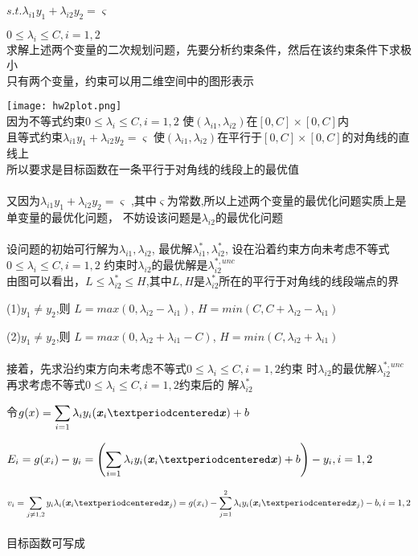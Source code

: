 \documentclass[UTF8]{ctexart}
\begin{document}
$s.t. $\quad $\lambda_{i1} y_1+\lambda_{i2} y_2=\varsigma $

$0 \leq \lambda_i \leq C,i=1,2$
\\
求解上述两个变量的二次规划问题，先要分析约束条件，然后在该约束条件下求极小
\\
只有两个变量，约束可以用二维空间中的图形表示

\texttt{[image: hw2plot.png]}
\\
因为不等式约束$0 \leq \lambda_i \leq C,i=1,2$
使$(\lambda_{i1},\lambda_{i2})$在$[0,C]×[0,C]$内
\\
且等式约束$\lambda_{i1} y_1+\lambda_{i2} y_2=\varsigma $
使$(\lambda_{i1},\lambda_{i2})$在平行于$[0,C]×[0,C]$的对角线的直线上
\\
所以要求是目标函数在一条平行于对角线的线段上的最优值
\\
\\
又因为$\lambda_{i1} y_1+\lambda_{i2} y_2=\varsigma $
,其中$\varsigma$为常数,所以上述两个变量的最优化问题实质上是单变量的最优化问题，
不妨设该问题是$\lambda_{i2}$的最优化问题
\\
\\
设问题的初始可行解为$\lambda_{i1},\lambda_{i2}$,
最优解$\lambda_{i1}^*,\lambda_{i2}^*$,
设在沿着约束方向未考虑不等式$0 \leq \lambda_i \leq C,i=1,2$
约束时$\lambda_{i2}$的最优解是$\lambda_{i2}^{*,unc}$
\\
由图可以看出，$L \leq \lambda_{i2}^* \leq H$,其中$L,H$是$\lambda_{i2}^*$所在的平行于对角线的线段端点的界

(1)$y_1 \neq y_2$,则
$L=max(0,\lambda_{i2}-\lambda_{i1})$,
$H=min(C,C+\lambda_{i2}-\lambda_{i1})$

(2)$y_1 \neq y_2$,则
$L=max(0,\lambda_{i2}+\lambda_{i1}-C)$,
$H=min(C,\lambda_{i2}+\lambda_{i1})$
\\
\\
接着，先求沿约束方向未考虑不等式$0 \leq \lambda_i \leq C,i=1,2$约束
时$\lambda_{i2}$的最优解$\lambda_{i2}^{*,unc}$
\\
再求考虑不等式$0 \leq \lambda_i \leq C,i=1,2$约束后的
解$\lambda_{i2}^*$

令$\displaystyle{g(x)=\sum_{i= 1}\lambda_iy_i(\textbf{\emph{x}}_i·\textbf{\emph{x}})+b}$

$\displaystyle{E_i=g(x_i)-y_i=\left(
        \sum_{i= 1}\lambda_iy_i(\textbf{\emph{x}}_i·\textbf{\emph{x}})+b
        \right)-y_i,i=1,2}$

$\displaystyle{v_i=\sum_{j\neq 1,2}y_i\lambda_i
        (\textbf{\emph{x}}_i·\textbf{\emph{x}}_j)
        =g(x_i)
        -\sum_{j= 1}^2 \lambda_iy_i(\textbf{\emph{x}}_i·\textbf{\emph{x}}_j)-b,i=1,2}$
\\
\\
目标函数可写成
\end{document}
